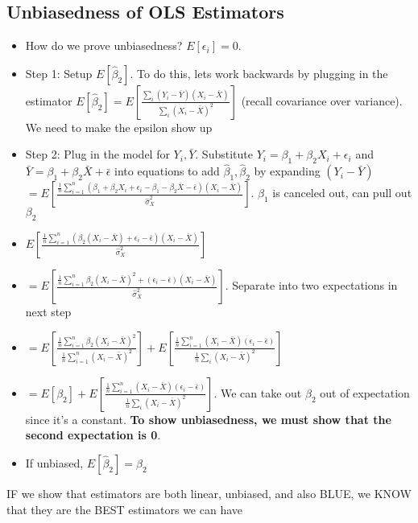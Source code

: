 \documentclass[10pt, oneside]{article}
\begin{document}
\subsection{Unbiasedness of OLS Estimators}
\begin{itemize}
    \item How do we prove unbiasedness? $E[\epsilon_i]=0$. 
    \item Step 1: Setup $E[\hat \beta_2 ]$. To do this, lets work backwards by plugging in the estimator $E[\hat \beta_2]=E\left[\frac{\sum_i (Y_i -\bar Y) (X_i -\bar X)}{\sum_i (X_i -\bar X)^2}\right]$ (recall covariance over variance). We need to make the epsilon show up 
    \item Step 2: Plug in the model for $Y_i, \bar Y$. Substitute $Y_i=\beta_1 + \beta_2 X_i + \epsilon_i$ and $\bar Y=\beta_1 +\beta_2 \bar X + \bar \epsilon$ into equations to add $\hat \beta_1, \hat \beta_2$ by expanding $(Y_i -\bar Y)$ \\
    $=E\left[\frac{\frac{1}{n} 
    \sum_{i=1} ^ n(\beta_1 + \beta_2 X_i + \epsilon_i - \beta_1 - \beta_2 \bar X -\bar \epsilon)(X_i -\bar X)}{\hat \sigma_X ^2}\right]$. $\beta_1$ is canceled out, can pull out $\beta_2$
    \item $E\left[\frac{\frac{1}{n} \sum_{i=1} ^ n (\beta_2 (X_i -\bar X) + \epsilon_i -\bar \epsilon)(X_i -\bar X)}{\hat \sigma_X ^2}\right]$
    \item $=E\left[\frac{\frac{1}{n} \sum_{i=1}^n \beta_2 (X_i - \bar X)^2 + (\epsilon_i -\bar \epsilon) (X_i -\bar X)}{\hat \sigma_X ^2}\right]$. Separate into two expectations in next step
    \item $=E\left[\frac{\frac{1}{n}\sum_{i=1} ^n \beta_2 (X_i -\bar X)^2}{\frac{1}{n} \sum_{i=1} ^n (X_i - \bar X)^2}\right] + E\left[ \frac{\frac{1}{n}\sum_{i=1} ^ n (X_i -\bar X) (\epsilon_i -\bar \epsilon)}{\frac{1}{n} \sum_i(X_i -\bar X)^2}\right]$
    \item $=E[\beta_2] + E\left[ \frac{\frac{1}{n}\sum_{i=1} ^ n (X_i -\bar X) (\epsilon_i -\bar \epsilon)}{\frac{1}{n} \sum_i(X_i -\bar X)^2}\right]$. We can take out $\beta_2$ out of expectation since it's a constant. \textbf{To show unbiasedness, we must show that the second expectation is 0}.
    \item If unbiased, $E[\hat \beta_2] = \beta_2$
\end{itemize}

IF we show that estimators are both linear, unbiased, and also BLUE, we KNOW that they are the BEST estimators we can have
\end{document}
